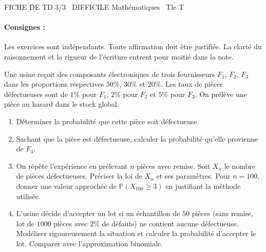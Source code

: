 \documentclass[11pt]{article}
\begin{document}
\begin{tcolorbox}[enhanced,colback=popink,colframe=popink,arc=10pt,boxrule=0pt,left=12pt,right=12pt,top=9pt,bottom=9pt]
{\color{white}\popxbold\small FICHE DE TD 3/3 \textbullet\ DIFFICILE \hfill Mathématiques \textbullet\ Tle T\par}
\end{tcolorbox}
\vspace{4pt}
\paragraph{Consignes :} Les exercices sont indépendants. Toute affirmation doit être justifiée. La clarté du raisonnement et la rigueur de l'écriture entrent pour moitié dans la note.

\begin{exercice}
Une usine reçoit des composants électroniques de trois fournisseurs $F_1$, $F_2$, $F_3$ dans les proportions respectives $50\%$, $30\%$ et $20\%$. Les taux de pièces défectueuses sont de $1\%$ pour $F_1$, $2\%$ pour $F_2$ et $5\%$ pour $F_3$. On prélève une pièce au hasard dans le stock global.
\begin{enumerate}
    \item Déterminer la probabilité que cette pièce soit défectueuse.
    \item Sachant que la pièce est défectueuse, calculer la probabilité qu'elle provienne de $F_3$.
    \item On répète l'expérience en prélevant $n$ pièces avec remise. Soit $X_n$ le nombre de pièces défectueuses. Préciser la loi de $X_n$ et ses paramètres. Pour $n=100$, donner une valeur approchée de $\mathbb{P}(X_{100} \geq 3)$ en justifiant la méthode utilisée.
    \item L'usine décide d'accepter un lot si un échantillon de $50$ pièces (sans remise, lot de $1000$ pièces avec $2\%$ de défauts) ne contient aucune défectueuse. Modéliser rigoureusement la situation et calculer la probabilité d'accepter le lot. Comparer avec l'approximation binomiale.
\end{enumerate}
\end{exercice}
\end{document}
